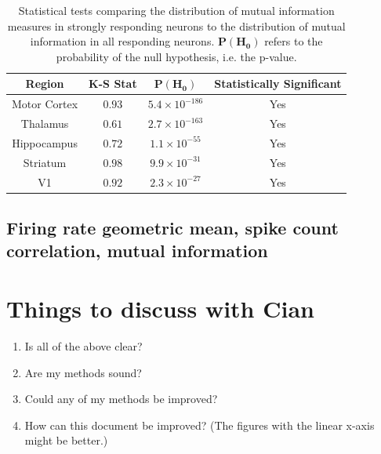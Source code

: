 \documentclass[a4paper,12pt]{article}
\theoremstyle{definition}
\begin{document}
\begin{table}[ht!]
  \begin{center}
    \caption{Statistical tests comparing the distribution of mutual information measures in strongly responding neurons to the distribution of mutual information in all responding neurons. $\mathbf{P(H_0)}$ refers to the probability of the null hypothesis, i.e. the p-value.}
    \label{tab:strong_info_ks_test}
    \begin{tabular}{c|c|c|c} %
      \textbf{Region} & \textbf{K-S Stat} & $\mathbf{P(H_0)}$ & \textbf{Statistically Significant}\\
      \hline
      Motor Cortex  & $0.93$  & $5.4 \times 10^{-186}$  & Yes \\
      Thalamus      & $0.61$  & $2.7 \times 10^{-163}$  & Yes \\
      Hippocampus   & $0.72$  & $1.1 \times 10^{-55}$   & Yes \\
      Striatum      & $0.98$  & $9.9 \times 10^{-31}$   & Yes \\
      V1            & $0.92$  & $2.3 \times 10^{-27}$   & Yes \\
    \end{tabular}
  \end{center}
\end{table}

\subsection{Firing rate geometric mean, spike count correlation, mutual information}


\section*{Things to discuss with Cian}
\begin{enumerate}
  \item Is all of the above clear?
  \item Are my methods sound?
  \item Could any of my methods be improved?
  \item How can this document be improved? (The figures with the linear x-axis might be better.)
\end{enumerate}


\newpage


\end{document}
